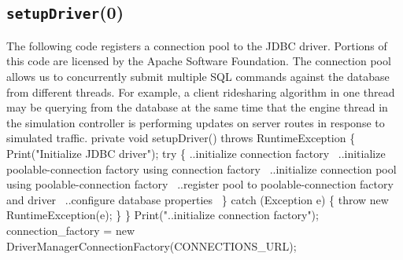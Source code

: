 \documentclass{article}
\def\nwendcode{\endtrivlist \endgroup}      %
\let\nwdocspar=\par
\theoremstyle{definition}                   %
\begin{document}
\subsection{{\tt{}\protect{}setupDriver}(0)}
The following code registers a connection pool to the JDBC driver.  Portions of
this code are licensed by the Apache Software Foundation.  The connection pool
allows us to concurrently submit multiple SQL commands against the database
from different threads. For example, a client ridesharing algorithm in one
thread may be querying from the database at the same time that the engine
thread in the simulation controller is performing updates on server routes
in response to simulated traffic.
\nwenddocs{}\endmoddef{}
private void setupDriver() throws RuntimeException \{
  Print("Initialize JDBC driver");
  try \{
    \LA{}..initialize connection factory~{\nwtagstyle{}}\RA{}
    \LA{}..initialize poolable-connection factory using connection factory~{\nwtagstyle{}}\RA{}
    \LA{}..initialize connection pool using poolable-connection factory~{\nwtagstyle{}}\RA{}
    \LA{}..register pool to poolable-connection factory and driver~{\nwtagstyle{}}\RA{}
    \LA{}..configure database properties~{\nwtagstyle{}}\RA{}
  \} catch (Exception e) \{
    throw new RuntimeException(e);
  \}
\}
\eatline
{}\nwendcode{}\endmoddef{}
Print("..initialize connection factory");
connection_factory = new DriverManagerConnectionFactory(CONNECTIONS_URL);
\nwendcode{}\nwdocspar
\end{document}
